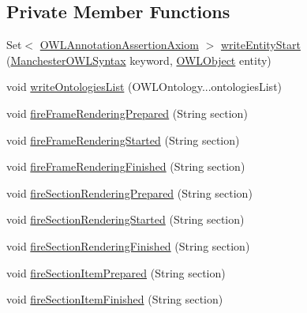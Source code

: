 \subsection*{Private Member Functions}
\begin{DoxyCompactItemize}
\item 
Set$<$ \hyperlink{interfaceorg_1_1semanticweb_1_1owlapi_1_1model_1_1_o_w_l_annotation_assertion_axiom}{O\-W\-L\-Annotation\-Assertion\-Axiom} $>$ \hyperlink{classuk_1_1ac_1_1manchester_1_1cs_1_1owl_1_1owlapi_1_1mansyntaxrenderer_1_1_manchester_o_w_l_syntax_frame_renderer_a61e6e857f01c48fc0dae9e1894b66d64}{write\-Entity\-Start} (\hyperlink{enumorg_1_1coode_1_1owlapi_1_1manchesterowlsyntax_1_1_manchester_o_w_l_syntax}{Manchester\-O\-W\-L\-Syntax} keyword, \hyperlink{interfaceorg_1_1semanticweb_1_1owlapi_1_1model_1_1_o_w_l_object}{O\-W\-L\-Object} entity)
\item 
void \hyperlink{classuk_1_1ac_1_1manchester_1_1cs_1_1owl_1_1owlapi_1_1mansyntaxrenderer_1_1_manchester_o_w_l_syntax_frame_renderer_a7fc510c8b8ce262583a05a74e8445034}{write\-Ontologies\-List} (O\-W\-L\-Ontology...\-ontologies\-List)
\item 
void \hyperlink{classuk_1_1ac_1_1manchester_1_1cs_1_1owl_1_1owlapi_1_1mansyntaxrenderer_1_1_manchester_o_w_l_syntax_frame_renderer_a217e25335bbf1960e23d1a9c0c4fbfda}{fire\-Frame\-Rendering\-Prepared} (String section)
\item 
void \hyperlink{classuk_1_1ac_1_1manchester_1_1cs_1_1owl_1_1owlapi_1_1mansyntaxrenderer_1_1_manchester_o_w_l_syntax_frame_renderer_acbfff3ce53ec0c57b7028d1271de3514}{fire\-Frame\-Rendering\-Started} (String section)
\item 
void \hyperlink{classuk_1_1ac_1_1manchester_1_1cs_1_1owl_1_1owlapi_1_1mansyntaxrenderer_1_1_manchester_o_w_l_syntax_frame_renderer_a7943798762c3bce5d6af081ba30efac5}{fire\-Frame\-Rendering\-Finished} (String section)
\item 
void \hyperlink{classuk_1_1ac_1_1manchester_1_1cs_1_1owl_1_1owlapi_1_1mansyntaxrenderer_1_1_manchester_o_w_l_syntax_frame_renderer_aab689939cc74a9cb2441407568665142}{fire\-Section\-Rendering\-Prepared} (String section)
\item 
void \hyperlink{classuk_1_1ac_1_1manchester_1_1cs_1_1owl_1_1owlapi_1_1mansyntaxrenderer_1_1_manchester_o_w_l_syntax_frame_renderer_a87c68924cb6fc8edee708a2dbc28cdc0}{fire\-Section\-Rendering\-Started} (String section)
\item 
void \hyperlink{classuk_1_1ac_1_1manchester_1_1cs_1_1owl_1_1owlapi_1_1mansyntaxrenderer_1_1_manchester_o_w_l_syntax_frame_renderer_ac6d850cbafa7dc1388ceaaf05469321f}{fire\-Section\-Rendering\-Finished} (String section)
\item 
void \hyperlink{classuk_1_1ac_1_1manchester_1_1cs_1_1owl_1_1owlapi_1_1mansyntaxrenderer_1_1_manchester_o_w_l_syntax_frame_renderer_a89bd0851568f6e6d13100a143ac06065}{fire\-Section\-Item\-Prepared} (String section)
\item 
void \hyperlink{classuk_1_1ac_1_1manchester_1_1cs_1_1owl_1_1owlapi_1_1mansyntaxrenderer_1_1_manchester_o_w_l_syntax_frame_renderer_a8578275ebf3f3c4e14689d5e852fd7b9}{fire\-Section\-Item\-Finished} (String section)
\end{DoxyCompactItemize}
